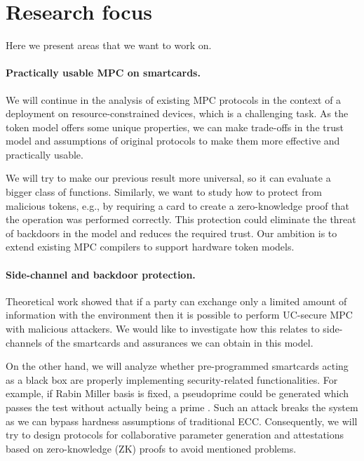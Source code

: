\documentclass[
  digital, %
  twoside, %
  table,   %
  lof,     %
  lot,     %
]{fithesis3}
\newcounter{ph4_show_guides}
\theoremstyle{definition}
\theoremstyle{remark}
\begin{document}
\section{Research focus}
Here we present areas that we want to work on.

\paragraph{Practically usable MPC on smartcards.}%
We will continue in the analysis of existing MPC protocols in the context of a deployment on resource-constrained devices, which is a challenging task.
As the token model offers some unique properties, we can make trade-offs in the trust model and assumptions of original protocols to make them more effective and practically usable. 

We will try to make our previous result \cite{2017-ccs-mavroudis} more universal, so it can evaluate a bigger class of functions. Similarly, we want to study how to protect from malicious tokens, e.g., by requiring a card to create a zero-knowledge proof that the operation was performed correctly.  This protection could eliminate the threat of backdoors in the model and reduces the required trust.
Our ambition is to extend existing MPC compilers to support hardware token models.

\paragraph{Side-channel and backdoor protection.}%
Theoretical work \cite{DNW09} showed that if a party can exchange only a limited amount of information with the environment then it is possible to perform UC-secure MPC with malicious attackers. We would like to investigate how this relates to side-channels of the smartcards and assurances we can obtain in this model.

On the other hand, we will analyze whether pre-programmed smartcards acting as a black box are properly implementing security-related functionalities. For example, if Rabin Miller basis is fixed, a pseudoprime could be generated which passes the test without actually being a prime \cite{10.1007/978-3-540-30580-4_2}. Such an attack breaks the system as we can bypass hardness assumptions of traditional ECC. Consequently, we will try to design protocols for collaborative parameter generation and attestations based on zero-knowledge (ZK) proofs to avoid mentioned problems.
\end{document}
